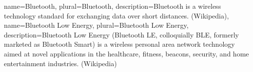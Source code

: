 %
{
	name=Bluetooth,
	plural=Bluetooth,
	description={Bluetooth is a wireless technology standard for exchanging data over short distances. (Wikipedia)},
}
{
	name=Bluetooth Low Energy,
	plural=Bluetooth Low Energy,
	description={Bluetooth Low Energy (Bluetooth LE, colloquially BLE, formerly marketed as Bluetooth Smart) is a wireless personal area network technology aimed at novel applications in the healthcare, fitness, beacons, security, and home entertainment industries. (Wikipedia)}
}




